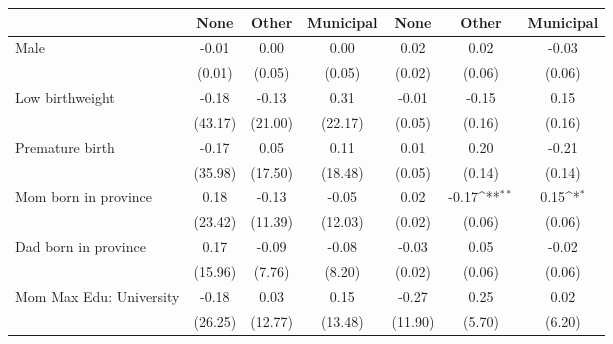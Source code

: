 {
\def\sym#1{\ifmmode^{#1}\else\(^{#1}\)\fi}
\begin{tabular}{l*{6}{c}}
\toprule
                    &\multicolumn{1}{c}{None}&\multicolumn{1}{c}{Other}&\multicolumn{1}{c}{Municipal}&\multicolumn{1}{c}{None}&\multicolumn{1}{c}{Other}&\multicolumn{1}{c}{Municipal}\\
\midrule
Male                &       -0.01         &        0.00         &        0.00         &        0.02         &        0.02         &       -0.03         \\
                    &      (0.01)         &      (0.05)         &      (0.05)         &      (0.02)         &      (0.06)         &      (0.06)         \\
\addlinespace
Low birthweight     &       -0.18         &       -0.13         &        0.31         &       -0.01         &       -0.15         &        0.15         \\
                    &     (43.17)         &     (21.00)         &     (22.17)         &      (0.05)         &      (0.16)         &      (0.16)         \\
\addlinespace
Premature birth     &       -0.17         &        0.05         &        0.11         &        0.01         &        0.20         &       -0.21         \\
                    &     (35.98)         &     (17.50)         &     (18.48)         &      (0.05)         &      (0.14)         &      (0.14)         \\
\addlinespace
Mom born in province&        0.18         &       -0.13         &       -0.05         &        0.02         &       -0.17\sym{**} &        0.15\sym{*}  \\
                    &     (23.42)         &     (11.39)         &     (12.03)         &      (0.02)         &      (0.06)         &      (0.06)         \\
\addlinespace
Dad born in province&        0.17         &       -0.09         &       -0.08         &       -0.03         &        0.05         &       -0.02         \\
                    &     (15.96)         &      (7.76)         &      (8.20)         &      (0.02)         &      (0.06)         &      (0.06)         \\
\addlinespace
Mom Max Edu: University&       -0.18         &        0.03         &        0.15         &       -0.27         &        0.25         &        0.02         \\
                    &     (26.25)         &     (12.77)         &     (13.48)         &     (11.90)         &      (5.70)         &      (6.20)         \\

\end{tabular}}
